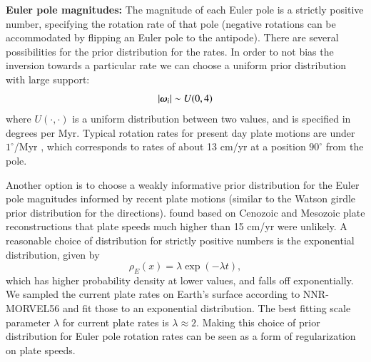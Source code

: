 \documentclass[preprint,12pt,authoryear]{elsarticle}
\newcommand{\mitbf}[1]{\hbox{\mathversion{bold}$#1$}}
\begin{document}
\textbf{Euler pole magnitudes:} 
The magnitude of each Euler pole is a strictly positive number, specifying the
rotation rate of that pole (negative rotations can be accommodated by flipping an Euler
pole to the antipode).
There are several possibilities for the prior distribution for the rates.
In order to not bias the inversion towards a particular
rate we can choose a uniform prior distribution with large support:
\begin{equation}
\vert \mitbf{\omega}_i \vert \sim U(0, 4)
\end{equation}
where $U(\cdot, \cdot)$ is a uniform distribution between two values, and is specified 
in degrees per Myr. Typical rotation rates for present day plate motions
are under $1^\circ$/Myr \citep{argus2011geologically}, which corresponds to rates
of about 13 cm/yr at a position $90^\circ$ from the pole.

Another option is to choose a weakly informative prior distribution for the Euler pole magnitudes
informed by recent plate motions (similar to the Watson girdle prior distribution for the directions).
\citet{zahirovic2015tectonic} found based on Cenozoic and Mesozoic plate reconstructions
that plate speeds much higher than 15 cm/yr were unlikely.
A reasonable choice of distribution for strictly positive numbers is the exponential distribution,
given by
\begin{equation}
\rho_E(x) = \lambda \exp(-\lambda t),
\end{equation}
which has higher probability density at lower values, and falls off exponentially.
We sampled the current plate rates on Earth's surface according to NNR-MORVEL56
and fit those to an exponential distribution. The best fitting scale parameter $\lambda$
for current plate rates is $\lambda\approx2$.
Making this choice of prior distribution for Euler pole rotation rates can be seen as a form
of regularization on plate speeds.
\end{document}
